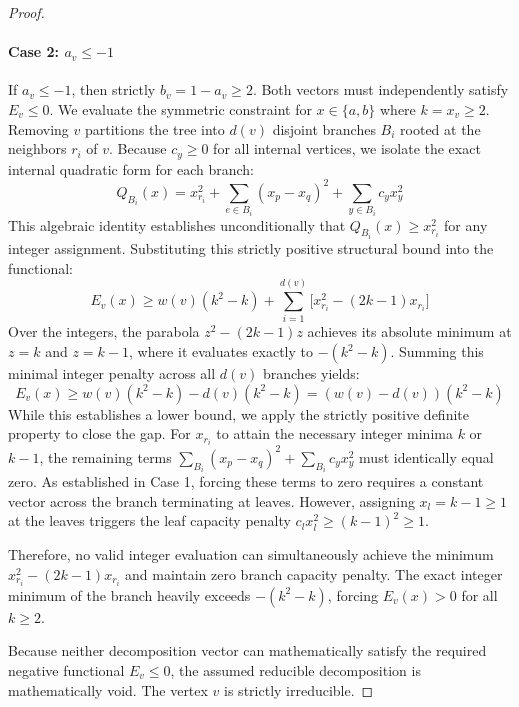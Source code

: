 \documentclass[12pt]{article}
\begin{document}
\begin{proof}
\paragraph{Case 2: $a_v \le -1$}
If $a_v \le -1$, then strictly $b_v = 1 - a_v \ge 2$. Both vectors must independently satisfy $E_v \le 0$. We evaluate the symmetric constraint for $x \in \{a, b\}$ where $k = x_v \ge 2$. 
Removing $v$ partitions the tree into $d(v)$ disjoint branches $B_i$ rooted at the neighbors $r_i$ of $v$. Because $c_y \ge 0$ for all internal vertices, we isolate the exact internal quadratic form for each branch:
\[
Q_{B_i}(x) = x_{r_i}^2 + \sum_{e \in B_i} (x_p - x_q)^2 + \sum_{y \in B_i} c_y x_y^2
\]
This algebraic identity establishes unconditionally that $Q_{B_i}(x) \ge x_{r_i}^2$ for any integer assignment. 
Substituting this strictly positive structural bound into the functional:
\[
E_v(x) \ge w(v)(k^2 - k) + \sum_{i=1}^{d(v)} \big[ x_{r_i}^2 - (2k-1)x_{r_i} \big]
\]
Over the integers, the parabola $z^2 - (2k-1)z$ achieves its absolute minimum at $z = k$ and $z = k-1$, where it evaluates exactly to $-(k^2 - k)$. 
Summing this minimal integer penalty across all $d(v)$ branches yields:
\[
E_v(x) \ge w(v)(k^2 - k) - d(v)(k^2 - k) = (w(v) - d(v))(k^2 - k)
\]
While this establishes a lower bound, we apply the strictly positive definite property to close the gap. For $x_{r_i}$ to attain the necessary integer minima $k$ or $k-1$, the remaining terms $\sum_{B_i} (x_p - x_q)^2 + \sum_{B_i} c_y x_y^2$ must identically equal zero. As established in Case 1, forcing these terms to zero requires a constant vector across the branch terminating at leaves. However, assigning $x_l = k-1 \ge 1$ at the leaves triggers the leaf capacity penalty $c_l x_l^2 \ge (k-1)^2 \ge 1$. 

Therefore, no valid integer evaluation can simultaneously achieve the minimum $x_{r_i}^2 - (2k-1)x_{r_i}$ and maintain zero branch capacity penalty. The exact integer minimum of the branch heavily exceeds $-(k^2-k)$, forcing $E_v(x) > 0$ for all $k \ge 2$. 

Because neither decomposition vector can mathematically satisfy the required negative functional $E_v \le 0$, the assumed reducible decomposition is mathematically void. The vertex $v$ is strictly irreducible.
\end{proof}
\end{document}

